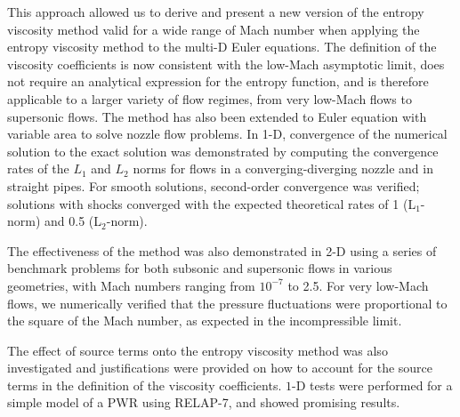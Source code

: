 This approach allowed us to derive and present a new version of the entropy viscosity method valid for a wide range of Mach number when applying the entropy viscosity method to the multi-D Euler equations. The definition of the viscosity coefficients
is now consistent with the low-Mach asymptotic limit, does not require an analytical expression 
for the entropy function, and is therefore applicable to a larger variety of flow regimes, from very 
low-Mach flows to supersonic flows. 
The method has also been extended to Euler equation with variable area to solve nozzle flow problems.
In 1-D, convergence of the numerical solution to 
the exact solution was demonstrated by computing the convergence rates of the $L_1$ and $L_2$ norms 
for flows in a converging-diverging nozzle and in straight pipes. For smooth solutions, second-order 
convergence was verified; solutions with shocks converged with the expected theoretical rates of 1 (L$_1$-norm)
and 0.5 (L$_2$-norm).

The effectiveness of the method was also demonstrated in 2-D using a series of benchmark problems
for both subsonic and supersonic flows in various geometries, with Mach numbers ranging from $10^{-7}$ to 
2.5. For very low-Mach flows, we numerically verified that the pressure fluctuations were proportional to 
the square of the Mach number, as expected in the incompressible limit.

The effect of source terms onto the entropy viscosity method was also investigated and justifications were provided on how to account for the source terms in the definition of the viscosity coefficients. $1$-D tests were performed for a simple model of a PWR using RELAP-7, and showed promising results.\\

